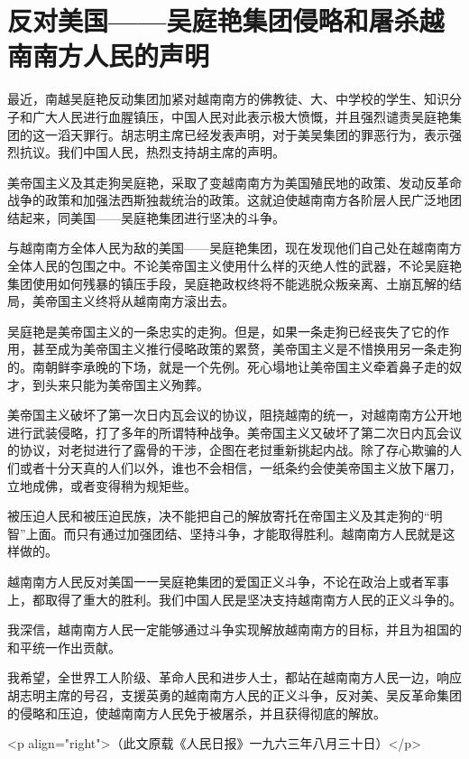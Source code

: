 \section[反对美国——吴庭艳集团侵略和屠杀越南南方人民的声明（一九六三年八月二十九日）]{反对美国——吴庭艳集团侵略和屠杀越南南方人民的声明}


最近，南越吴庭艳反动集团加紧对越南南方的佛教徒、大、中学校的学生、知识分子和广大人民进行血腥镇压，中国人民对此表示极大愤慨，并且强烈谴责吴庭艳集团的这一滔天罪行。胡志明主席已经发表声明，对于美吴集团的罪恶行为，表示强烈抗议。我们中国人民，热烈支持胡主席的声明。

美帝国主义及其走狗吴庭艳，采取了变越南南方为美国殖民地的政策、发动反革命战争的政策和加强法西斯独裁统治的政策。这就迫使越南南方各阶层人民广泛地团结起来，同美国——吴庭艳集团进行坚决的斗争。

与越南南方全体人民为敌的美国——吴庭艳集团，现在发现他们自己处在越南南方全体人民的包围之中。不论美帝国主义使用什么样的灭绝人性的武器，不论吴庭艳集团使用如何残暴的镇压手段，吴庭艳政权终将不能逃脱众叛亲离、土崩瓦解的结局，美帝国主义终将从越南南方滚出去。

吴庭艳是美帝国主义的一条忠实的走狗。但是，如果一条走狗已经丧失了它的作用，甚至成为美帝国主义推行侵略政策的累赘，美帝国主义是不惜换用另一条走狗的。南朝鲜李承晚的下场，就是一个先例。死心塌地让美帝国主义牵着鼻子走的奴才，到头来只能为美帝国主义殉葬。

美帝国主义破坏了第一次日内瓦会议的协议，阻挠越南的统一，对越南南方公开地进行武装侵略，打了多年的所谓特种战争。美帝国主义又破坏了第二次日内瓦会议的协议，对老挝进行了露骨的干涉，企图在老挝重新挑起内战。除了存心欺骗的人们或者十分天真的人们以外，谁也不会相信，一纸条约会使美帝国主义放下屠刀，立地成佛，或者变得稍为规矩些。

被压迫人民和被压迫民族，决不能把自己的解放寄托在帝国主义及其走狗的“明智”上面。而只有通过加强团结、坚持斗争，才能取得胜利。越南南方人民就是这样做的。

越南南方人民反对美国一一吴庭艳集团的爱国正义斗争，不论在政治上或者军事上，都取得了重大的胜利。我们中国人民是坚决支持越南南方人民的正义斗争的。

我深信，越南南方人民一定能够通过斗争实现解放越南南方的目标，并且为祖国的和平统一作出贡献。

我希望，全世界工人阶级、革命人民和进步人士，都站在越南南方人民一边，响应胡志明主席的号召，支援英勇的越南南方人民的正义斗争，反对美、吴反革命集团的侵略和压迫，使越南南方人民免于被屠杀，并且获得彻底的解放。

<p align="right">（此文原载《人民日报》一九六三年八月三十日）</p>


